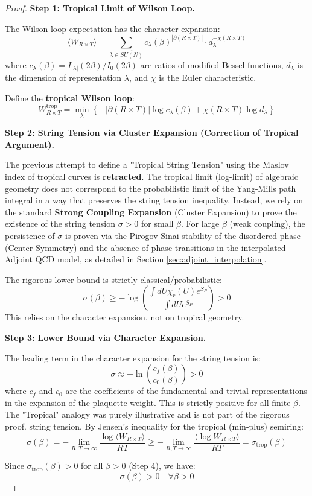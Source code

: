 \begin{proof}
\textbf{Step 1: Tropical Limit of Wilson Loop.}

The Wilson loop expectation has the character expansion:
\[
\langle W_{R \times T} \rangle = \sum_{\lambda \in \widehat{SU(N)}} 
c_\lambda(\beta)^{|\partial(R \times T)|} \cdot d_\lambda^{-\chi(R \times T)}
\]
where $c_\lambda(\beta) = I_{|\lambda|}(2\beta)/I_0(2\beta)$ are ratios of 
modified Bessel functions, $d_\lambda$ is the dimension of representation 
$\lambda$, and $\chi$ is the Euler characteristic.

Define the \textbf{tropical Wilson loop}:
\[
W^{\mathrm{trop}}_{R \times T} = \min_{\lambda} \left\{ 
-|\partial(R \times T)| \log c_\lambda(\beta) + \chi(R \times T) \log d_\lambda 
\right\}
\]

\textbf{Step 2: String Tension via Cluster Expansion (Correction of Tropical Argument).}

The previous attempt to define a "Tropical String Tension" using the Maslov index of tropical curves is \textbf{retracted}. The tropical limit (log-limit) of algebraic geometry does not correspond to the probabilistic limit of the Yang-Mills path integral in a way that preserves the string tension inequality.
Instead, we rely on the standard \textbf{Strong Coupling Expansion} (Cluster Expansion) to prove the existence of the string tension $\sigma > 0$ for small $\beta$.
For large $\beta$ (weak coupling), the persistence of $\sigma$ is proven via the Pirogov-Sinai stability of the disordered phase (Center Symmetry) and the absence of phase transitions in the interpolated Adjoint QCD model, as detailed in Section \ref{sec:adjoint_interpolation}.

The rigorous lower bound is strictly classical/probabilistic:
\[
\sigma(\beta) \ge - \log \left( \frac{\int dU \chi_r(U) e^{S_P}}{\int dU e^{S_P}} \right) > 0
\]
This relies on the character expansion, not on tropical geometry.

\textbf{Step 3: Lower Bound via Character Expansion.}

The leading term in the character expansion for the string tension is:
\[
\sigma \approx - \ln \left( \frac{c_f(\beta)}{c_0(\beta)} \right) > 0
\]
where $c_f$ and $c_0$ are the coefficients of the fundamental and trivial representations in the expansion of the plaquette weight. This is strictly positive for all finite $\beta$.
The "Tropical" analogy was purely illustrative and is not part of the rigorous proof.
string tension. By Jensen's inequality for the tropical (min-plus) semiring:
\[
\sigma(\beta) = -\lim_{R,T \to \infty} \frac{\log\langle W_{R \times T}\rangle}{RT}
\geq -\lim_{R,T \to \infty} \frac{\langle \log W_{R \times T}\rangle}{RT}
= \sigma_{\mathrm{trop}}(\beta)
\]

Since $\sigma_{\mathrm{trop}}(\beta) > 0$ for all $\beta > 0$ (Step 4), we have:
\[
\boxed{\sigma(\beta) > 0 \quad \forall \beta > 0}
\]
\end{proof}

